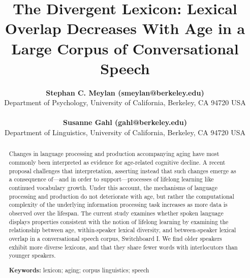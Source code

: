 \documentclass[10pt,letterpaper]{article}
\title{The Divergent Lexicon: Lexical Overlap Decreases With Age in a Large Corpus of Conversational Speech}
\author{{\large \bf Stephan C. Meylan (smeylan@berkeley.edu)} \\
Department of Psychology, University of California, Berkeley, CA 94720 USA\\
\\
{\large \bf Susanne Gahl (gahl@berkeley.edu)} \\
Department of Linguistics, University of California, Berkeley, CA 94720 USA \\
}
\begin{document}
\renewcommand{\baselinestretch}{0.97}

\maketitle

\begin{abstract}
Changes in language processing and production accompanying aging have most commonly been interpreted as evidence for age-related cognitive decline. A recent proposal \citep{ramscarEtAl2014} challenges that interpretation, asserting instead that such changes emerge as a consequence of---and in order to support---processes of lifelong learning like continued vocabulary growth. Under this account, the mechanisms of language processing and production do not deteriorate with age, but rather the computational complexity of the underlying information processing task increases as more data is observed over the lifespan. The current study examines whether spoken language displays properties consistent with the notion of lifelong learning by examining the relationship between age, within-speaker lexical diversity, and between-speaker lexical overlap in a conversational speech corpus, Switchboard I. We find older speakers exhibit more diverse lexicons, and that they share fewer words with interlocutors than younger speakers. 
%

\textbf{Keywords:} 
lexicon; aging; corpus linguistics; speech
\end{abstract}
\end{document}
